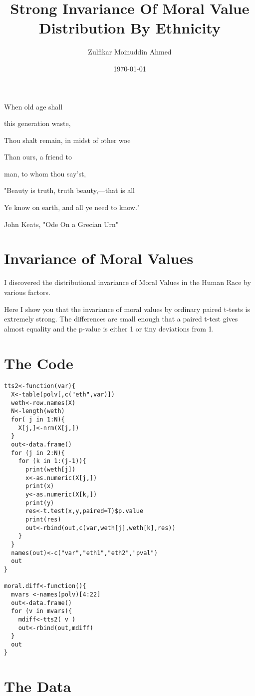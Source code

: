 \documentclass{amsart}
\title{Strong Invariance Of Moral Value Distribution By Ethnicity}
\author{Zulfikar Moinuddin Ahmed}
\date{\today}
\begin{document}
\maketitle
\epigraph{

 When old age shall
 
  this generation waste,
  
                Thou shalt remain, in midst
                 of other woe

Than ours, a friend to 

man, to whom thou say'st,


         "Beauty is truth, truth beauty,—that is all

                Ye know on earth, and all ye need to know."}{John Keats, "Ode On a Grecian Urn"}
                

\section{Invariance of Moral Values}

I discovered the distributional invariance of Moral Values in the Human Race by various factors.  

Here I show you that the invariance of moral values by ordinary paired t-tests is extremely strong.  The differences are small enough that a paired t-test gives almost equality and the p-value is either 1 or tiny deviations from 1.

\section{The Code}

\begin{verbatim}
tts2<-function(var){
  X<-table(polv[,c("eth",var)])
  weth<-row.names(X)
  N<-length(weth)
  for( j in 1:N){
    X[j,]<-nrm(X[j,])
  }
  out<-data.frame()
  for (j in 2:N){
    for (k in 1:(j-1)){
      print(weth[j])
      x<-as.numeric(X[j,])
      print(x)
      y<-as.numeric(X[k,])
      print(y)
      res<-t.test(x,y,paired=T)$p.value
      print(res)
      out<-rbind(out,c(var,weth[j],weth[k],res))
    } 
  }
  names(out)<-c("var","eth1","eth2","pval")
  out
}

moral.diff<-function(){
  mvars <-names(polv)[4:22]
  out<-data.frame()
  for (v in mvars){
    mdiff<-tts2( v )
    out<-rbind(out,mdiff)
  }
  out
}

\end{verbatim}


\section{The Data}
\end{document}
